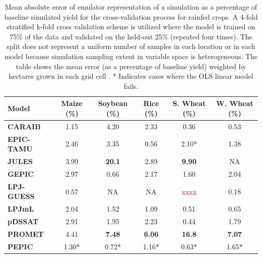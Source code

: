 \documentclass[gmd, manuscript]{copernicus} %
\begin{document}
\begin{table}[ht]
    \caption{
    Mean absolute error of emulator representation of a simulation as a percentage of baseline simulated yield for the cross-validation process for rainfed crops. 
    A 4-fold stratified k-fold cross validation scheme is utilized where the model is trained on 75\% of the data and validated on the held-out 25\% (repeated four times). 
    The split does not represent a uniform number of samples in each location or in each model because simulation sampling extent in variable space is heterogeneous. 
    The table shows the mean error (as a percentage of baseline yield) weighted by hectares grown in each grid cell \citep{Portmann2010}.
    * Indicates cases where the OLS linear model fails.
    } 
    \label{table:ASE}
    \begin{tabular}{l | c | c | c | c | c} 
        \hline
        \textbf{Model}     & \textbf{Maize (\%)} & \textbf{Soybean (\%)} & \textbf{Rice (\%)} & \textbf{S. Wheat (\%)} & \textbf{W. Wheat (\%)} \\ \hline
        \textbf{CARAIB}    & 1.15  & 4.20  & 2.33  & 0.36  & 0.53   \\ \hline
        \textbf{EPIC-TAMU} & 2.46  & 3.35  & 0.56  & 2.10* & 1.38   \\ \hline
        \textbf{JULES}     & 3.99  & \textbf{20.1} & 2.89  & \textbf{9.90}  & NA     \\ \hline
        \textbf{GEPIC}     & 2.97  & 0.66  & 2.17  & 1.60  & 2.04   \\ \hline
        \textbf{LPJ-GUESS} & 0.57  & NA    & NA    & \textcolor{red}{xxxx}  & 0.18   \\ \hline
        \textbf{LPJmL}     & 2.04  & 1.52  & 1.09  & 0.51  & 0.65   \\ \hline
        \textbf{pDSSAT}    & 2.91  & 1.95  & 2.23  & 0.44  & 1.79   \\ \hline
        \textbf{PROMET}    & 4.41  & \textbf{7.48} & \textbf{6.06}  & \textbf{16.8}  & \textbf{7.07}   \\ \hline
        \textbf{PEPIC}     & 1.30* & 0.72* & 1.16* & 0.63* & 1.65*  \\ \hline
    \end{tabular}
\end{table}
\end{document}
